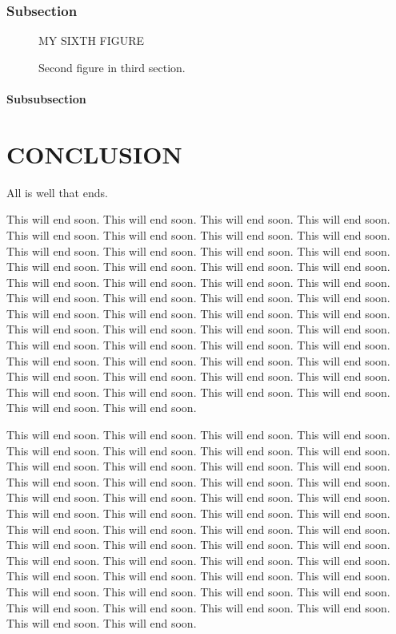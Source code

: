\documentclass[12pt,econ]{sources/authesis}
\theoremstyle{definition}
\theoremstyle{definition}
\theoremstyle{definition}
\theoremstyle{remark}
\begin{document}
\subsection{Subsection}\label{subsection-6}
\begin{figure}
\centering MY SIXTH FIGURE
\caption{Second figure in third section.}
\end{figure}
\subsubsection{Subsubsection}\label{subsubsection-2}

\chapter{CONCLUSION}\label{conclusion}

All is well that ends.

This will end soon. This will end soon. This will end soon. This will
end soon. This will end soon. This will end soon. This will end soon.
This will end soon. This will end soon. This will end soon. This will
end soon. This will end soon. This will end soon. This will end soon.
This will end soon. This will end soon. This will end soon. This will
end soon. This will end soon. This will end soon. This will end soon.
This will end soon. This will end soon. This will end soon. This will
end soon. This will end soon. This will end soon. This will end soon.
This will end soon. This will end soon. This will end soon. This will
end soon. This will end soon. This will end soon. This will end soon.
This will end soon. This will end soon. This will end soon. This will
end soon. This will end soon. This will end soon. This will end soon.
This will end soon. This will end soon. This will end soon. This will
end soon. This will end soon. This will end soon. This will end soon.
This will end soon.

This will end soon. This will end soon. This will end soon. This will
end soon. This will end soon. This will end soon. This will end soon.
This will end soon. This will end soon. This will end soon. This will
end soon. This will end soon. This will end soon. This will end soon.
This will end soon. This will end soon. This will end soon. This will
end soon. This will end soon. This will end soon. This will end soon.
This will end soon. This will end soon. This will end soon. This will
end soon. This will end soon. This will end soon. This will end soon.
This will end soon. This will end soon. This will end soon. This will
end soon. This will end soon. This will end soon. This will end soon.
This will end soon. This will end soon. This will end soon. This will
end soon. This will end soon. This will end soon. This will end soon.
This will end soon. This will end soon. This will end soon. This will
end soon. This will end soon. This will end soon. This will end soon.
This will end soon.
\end{document}
